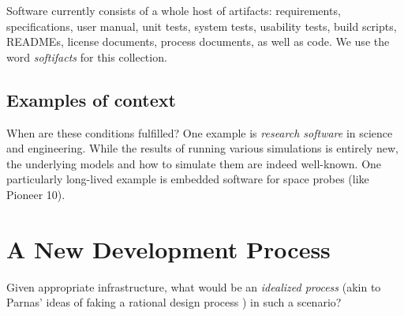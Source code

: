 \documentclass[sigconf,review,anonymous=false]{acmart}
\begin{document}
Software currently consists of a whole host of artifacts: requirements,
specifications, user manual, unit tests, system tests, usability tests,
build scripts, READMEs, license documents, process documents, as well as
code. We use the word \emph{softifacts} for this collection.

\subsection{Examples of context}

When are these conditions fulfilled? One example is
\emph{research software} in science and engineering. While the results of
running various simulations is entirely new, the underlying models and
how to simulate them are indeed well-known. One particularly long-lived
example is embedded software for space probes (like Pioneer 10).

\section{A New Development Process}\label{ch:process}

Given appropriate infrastructure, what would be an \emph{idealized process}
(akin to Parnas' ideas of faking a rational design process \cite{Parnas1986})
in such a scenario?
\end{document}
